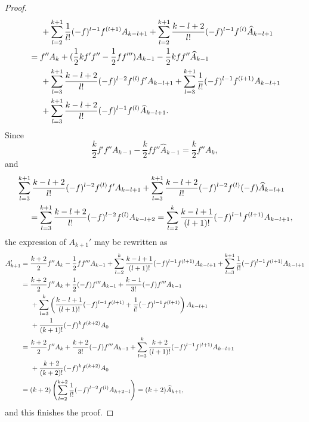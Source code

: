 \documentclass{article}
\begin{document}
\begin{proof}
\begin{align*}
    &\hspace{0.5cm}
    +\sum_{l=2}^{k+1}\frac{1}{l!}(-f)^{l-1}f^{(l+1)}A_{k-l+1}
    +\sum_{l=2}^{k+1}\frac{k-l+2}{l!}(-f)^{l-1}f^{(l)}\widehat{A}_{k-l+1}\\
    &=f''A_{k}+(\frac{1}{2}kf'f''-\frac{1}{2}ff''')A_{k-1}-\frac{1}{2}kff''\widehat{A}_{k-1}\\
    &\hspace{0.5cm}
    +\sum_{l=3}^{k+1}\frac{k-l+2}{l!}(-f)^{l-2}f^{(l)}f'A_{k-l+1}+\sum_{l=3}^{k+1}\frac{1}{l!}(-f)^{l-1}f^{(l+1)}A_{k-l+1}\\
    &\hspace{0.5cm}
    +\sum_{l=3}^{k+1}\frac{k-l+2}{l!}(-f)^{l-1}f^{(l)}\widehat{A}_{k-l+1}.
  \end{align*}
  Since
  \[
    \frac{k}{2}f'f''A_{k-1}-\frac{k}{2}ff''\widehat{A}_{k-1}=\frac{k}{2}f''A_{k},
  \]
  and
  \begin{align*}
    & \sum_{l=3}^{k+1}\frac{k-l+2}{l!}(-f)^{l-2}f^{(l)}f'A_{k-l+1}+\sum_{l=3}^{k+1}\frac{k-l+2}{l!}(-f)^{l-2}f^{(l)}(-f)\widehat{A}_{k-l+1}\\
    &\hspace{0.5cm}= \sum_{l=3}^{k+1}\frac{k-l+2}{l!}(-f)^{l-2}f^{(l)}A_{k-l+2} = \sum_{l=2}^{k}\frac{k-l+1}{(l+1)!}(-f)^{l-1}f^{(l+1)}A_{k-l+1},
  \end{align*}
  the expression of $A_{k+1}'$ may be rewritten as 
  \begin{align*}
    A_{k+1}' &= \frac{k+2}{2}f''A_{k}-\frac{1}{2}ff'''A_{k-1}+\sum_{l=2}^{k}\frac{k-l+1}{(l+1)!}(-f)^{l-1}f^{(l+1)}A_{k-l+1}+\sum_{l=3}^{k+1}\frac{1}{l!}(-f)^{l-1}f^{(l+1)}A_{k-l+1}\\
    &=
    \frac{k+2}{2}f''A_{k}+\frac{1}{2}(-f)f'''A_{k-1}+\frac{k-1}{3!}(-f)f'''A_{k-1}\\
    &\hspace{0.5cm}
    +\sum_{l=3}^{k}\left(\frac{k-l+1}{(l+1)!}(-f)^{l-1}f^{(l+1)}+\frac{1}{l!}(-f)^{l-1}f^{(l+1)}\right)A_{k-l+1}\\
&\hspace{0.5cm}
    +\frac{1}{(k+1)!}(-f)^{k}f^{(k+2)}A_{0}\\
    &=
    \frac{k+2}{2}f''A_{k}+\frac{k+2}{3!}(-f)f'''A_{k-1}+\sum_{l=3}^{k}\frac{k+2}{(l+1)!}(-f)^{l-1}f^{(l+1)}A_{k-l+1}\\
&\hspace{0.5cm}+\frac{k+2}{(k+2)!}(-f)^{k}f^{(k+2)}A_{0}\\
    &=
    (k+2)\left(\sum_{l=2}^{k+2}\frac{1}{l!}(-f)^{l-2}f^{(l)}A_{k+2-l}\right) = (k+2)\widehat{A}_{k+1},
  \end{align*} 
  and this finishes the proof.
\end{proof}
\end{document}
